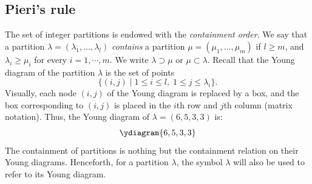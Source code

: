 \documentclass[11pt]{amsproc}
\theoremstyle{definition}
\theoremstyle{example}
\begin{document}
\subsection{Pieri's rule}
\label{sec:pieri}
The set of integer partitions is endowed with the \emph{containment order}.
We say that a partition $\lambda=(\lambda_1,\dotsc,\lambda_l)$ \emph{contains} a partition $\mu=(\mu_1,\dotsc, \mu_m)$ if $l \geq m$, and $\lambda_i\geq \mu_i$ for every $i=1,\dotsb, m$.
We write $\lambda\supset\mu$ or $\mu \subset \lambda$.
Recall that the Young diagram of the partition $\lambda$ is the set of points 
\begin{displaymath}
\{(i, j)\mid 1\leq i\leq l,\; 1\leq j\leq \lambda_i\}.
\end{displaymath}
Visually, each node $(i,j)$ of the Young diagram is replaced by a box, and the box corresponding to $(i,j)$ is placed in the $i$th row and $j$th column (matrix notation).
Thus, the Young diagram of $\lambda=(6, 5, 3, 3)$ is:
\begin{displaymath}
  \ydiagram{6,5,3,3}
\end{displaymath}
The containment of partitions is nothing but the containment relation on their Young diagrams.
Henceforth, for a partition $\lambda$, the symbol $\lambda$ will also be used to refer to its Young diagram.
\end{document}
